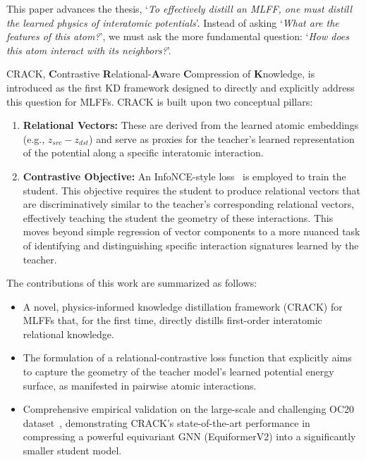 \documentclass{article}
\begin{document}
This paper advances the thesis, `\emph{To effectively distill an MLFF, one must distill the learned physics of interatomic potentials}'. 
Instead of asking `\emph{What are the features of this atom?}', we must ask the more fundamental question: `\emph{How does this atom interact with its neighbors?}'.

CRACK, \textbf{C}ontrastive \textbf{R}elational-\textbf{A}ware \textbf{C}ompression of \textbf{K}nowledge, is introduced as the first KD framework designed to directly and explicitly address this question for MLFFs. 
CRACK is built upon two conceptual pillars:
\begin{enumerate}
\item \textbf{Relational Vectors:} These are derived from the learned atomic embeddings (e.g., $z_{src} - z_{dst}$) and serve as proxies for the teacher's learned representation of the potential along a specific interatomic interaction.
\item \textbf{Contrastive Objective:} An InfoNCE-style loss~\citep{oord2018representation} is employed to train the student. This objective requires the student to produce relational vectors that are discriminatively similar to the teacher's corresponding relational vectors, effectively teaching the student the geometry of these interactions. This moves beyond simple regression of vector components to a more nuanced task of identifying and distinguishing specific interaction signatures learned by the teacher.
\end{enumerate}

The contributions of this work are summarized as follows:
\begin{itemize}
\item A novel, physics-informed knowledge distillation framework (CRACK) for MLFFs that, for the first time, directly distills first-order interatomic relational knowledge.
\item The formulation of a relational-contrastive loss function that explicitly aims to capture the geometry of the teacher model's learned potential energy surface, as manifested in pairwise atomic interactions.
\item Comprehensive empirical validation on the large-scale and challenging OC20 dataset~\citep{chanussot2021open}, demonstrating CRACK's state-of-the-art performance in compressing a powerful equivariant GNN (EquiformerV2) into a significantly smaller student model.
\end{itemize}


\end{document}
